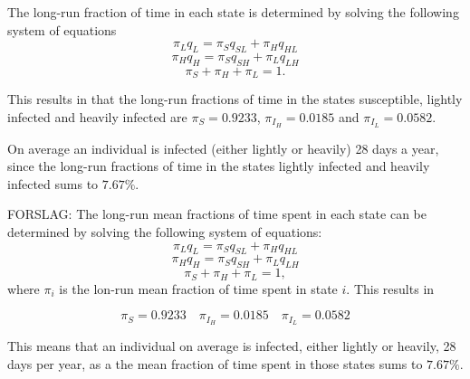 The long-run fraction of time in each state is determined by solving the following system of equations
$$ \pi_L q_L = \pi_S q_{SL} + \pi_H q_{HL}$$
$$ \pi_H q_H = \pi_S q_{SH} + \pi_L q_{LH}$$
$$ \pi_S + \pi_H +\pi_L = 1 .$$

This results in that the long-run fractions of time in the states susceptible, lightly infected and heavily infected are $\pi_S = 0.9233$, $\pi_{I_H} = 0.0185$ and $\pi_{I_L} = 0.0582$. 

On average an individual is infected (either lightly or heavily) 28 days a year, since the long-run fractions of time in the states lightly infected and heavily infected sums to $7.67\%$.


FORSLAG: The long-run mean fractions of time spent in each state can be determined by solving the following system of equations:
$$ \pi_L q_L = \pi_S q_{SL} + \pi_H q_{HL}$$
$$ \pi_H q_H = \pi_S q_{SH} + \pi_L q_{LH}$$
$$ \pi_S + \pi_H +\pi_L = 1, $$
where $\pi_i$ is the lon-run mean fraction of time spent in state $i$. This results in 

$$\pi_S = 0.9233 \quad \pi_{I_H} = 0.0185 \quad \pi_{I_L} = 0.0582$$

This means that an individual on average is infected, either lightly or heavily, 28 days per year, as a the mean fraction of time spent in those states sums to $7.67\%$.



